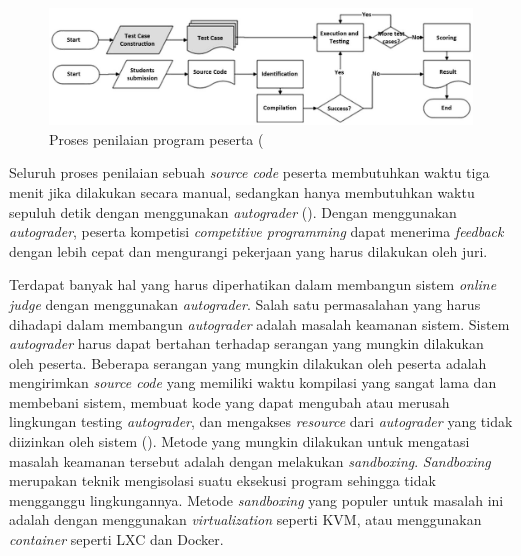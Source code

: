 \begin{figure}
	\centering
	\includegraphics[width=\textwidth]{images/grading-process}
	\caption{Proses penilaian program peserta (\cite{danutamalms}}
	\label{fig:grading-process}
\end{figure}

\par Seluruh proses penilaian sebuah \textit{source code} peserta membutuhkan waktu tiga menit jika dilakukan secara manual, sedangkan hanya membutuhkan waktu sepuluh detik dengan menggunakan \textit{autograder} (\cite{danutamalms}). Dengan menggunakan \textit{autograder}, peserta kompetisi \textit{competitive programming} dapat menerima \textit{feedback} dengan lebih cepat dan mengurangi pekerjaan yang harus dilakukan oleh juri.

\par Terdapat banyak hal yang harus diperhatikan dalam membangun sistem \textit{online judge} dengan menggunakan \textit{autograder}. Salah satu permasalahan yang harus dihadapi dalam membangun \textit{autograder} adalah masalah keamanan sistem. Sistem \textit{autograder} harus dapat bertahan terhadap serangan yang mungkin dilakukan oleh peserta. Beberapa serangan yang mungkin dilakukan oleh peserta adalah mengirimkan \textit{source code} yang memiliki waktu kompilasi yang sangat lama dan membebani sistem, membuat kode yang dapat mengubah atau merusah lingkungan testing \textit{autograder}, dan mengakses \textit{resource} dari \textit{autograder} yang tidak diizinkan oleh sistem (\cite{wasikojsurvey}). Metode yang mungkin dilakukan untuk mengatasi masalah keamanan tersebut adalah dengan melakukan \textit{sandboxing}. \textit{Sandboxing} merupakan teknik mengisolasi suatu eksekusi program sehingga tidak mengganggu lingkungannya. Metode \textit{sandboxing} yang populer untuk masalah ini adalah dengan menggunakan \textit{virtualization} seperti KVM, atau menggunakan \textit{container} seperti LXC dan Docker.

